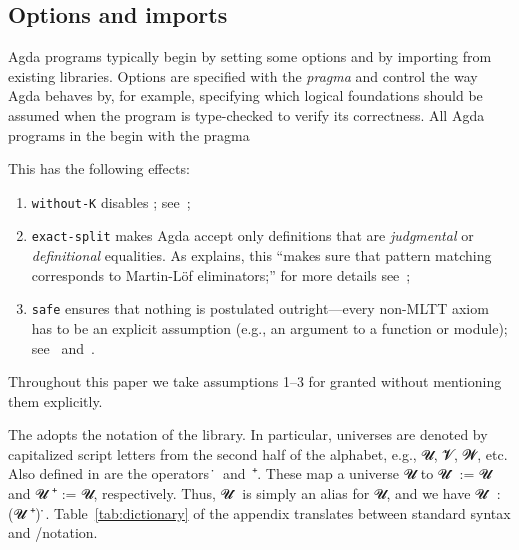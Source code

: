 \documentclass[a4paper,UKenglish,cleveref,autoref,thm-restate]{lipics-v2021}
\begin{document}
\subsection{Options and imports}\label{ssec:options-and-imports}
Agda programs typically begin by setting some options and by importing from existing libraries.
Options are specified with the  \emph{pragma} and control the way Agda behaves by, for example, specifying which logical foundations should be assumed when the program is type-checked to verify its correctness.  
All Agda programs in the \ualib begin with the pragma
\ccpad
\begin{code}[number=code:options]
\>[0]\AgdaSymbol{\{-\#}\AgdaSpace{}%
\AgdaSpace{}%
\AgdaSpace{}%
\AgdaSpace{}%
\AgdaSpace{}%
\AgdaSymbol{\#-\}}\<%
\end{code}
\ccpad
This has the following effects:
\begin{enumerate}
\item
  \texttt{without-K} disables \axiomk; see~\cite{agdaref-axiomk};
\item
  \texttt{exact-split} makes Agda accept only definitions that are \emph{judgmental} or \emph{definitional} equalities. As \escardo explains, this ``makes sure that pattern matching corresponds to Martin-Löf eliminators;'' for more details see~\cite{agdatools-patternmatching};
\item
  \texttt{safe} ensures that nothing is postulated outright---every non-MLTT axiom has to be an explicit assumption (e.g., an argument to a function or module); see~\cite{agdaref-safeagda} and~\cite{agdatools-patternmatching}.
\end{enumerate}
Throughout this paper we take assumptions 1--3 for granted without mentioning them explicitly.


The \agdaualib adopts the notation of the \typetopology library. In particular, universes are denoted by capitalized script letters from the second half of the alphabet, e.g., \ab 𝓤, \ab 𝓥, \ab 𝓦, etc. Also defined in \typetopology are the operators~\af ̇~and~\af ⁺. These map a universe \ab 𝓤 to \ab 𝓤 \af ̇ := \Set \ab 𝓤 and \ab 𝓤 \af ⁺ \aod := \lsuc \ab 𝓤, respectively.  Thus, \ab 𝓤 \af ̇ is simply an alias for \Set \ab 𝓤, and we have \ab 𝓤 \af ̇ \as : (\ab 𝓤 \af ⁺) \af ̇. Table~\ref{tab:dictionary} of the appendix translates between standard \agda syntax and \typetopology/\ualib notation.
\end{document}
